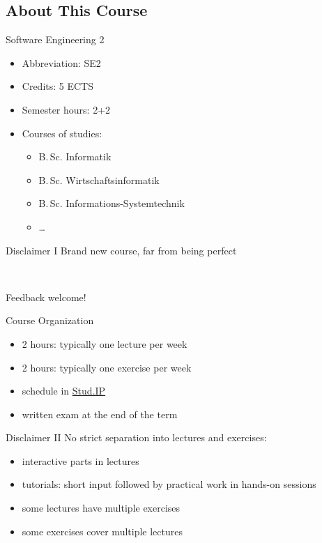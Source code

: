 \newcommand{\StudIPLink}{https://studip.tu-braunschweig.de/dispatch.php/course/details?sem_id=635f5186b364a369979d0f45ab2ace1d}
\newcommand{\StudIP}{\href{\StudIPLink}{Stud.IP}}

\subsection{About This Course} 
\begin{frame}{\insertsubsection}
	\begin{fancycolumns}
		\begin{definition}{Software Engineering 2}
			\begin{itemize}
				\item Abbreviation: SE2
				\item Credits: 5 ECTS
				\item Semester hours: 2+2
				\item Courses of studies:
				\begin{itemize}
					\item B.\,Sc.{} Informatik
					\item B.\,Sc.{} Wirtschaftsinformatik
					\item B.\,Sc.{} Informations-Systemtechnik
					\item \ldots
				\end{itemize}
			\end{itemize}
		\end{definition}
		\begin{note}{Disclaimer I}
			Brand new course, far from being perfect
			
			~
			
			Feedback welcome!
		\end{note}
		\nextcolumn
		\begin{definition}{Course Organization}
			\begin{itemize}
				\item 2 hours: typically one lecture per week
				\item 2 hours: typically one exercise per week
				\item schedule in \StudIP
				\item written exam at the end of the term
			\end{itemize}
		\end{definition}
		\begin{note}{Disclaimer II}
			No strict separation into lectures and exercises:
			\begin{itemize}
				\item interactive parts in lectures
				\item tutorials: short input followed by practical work in hands-on sessions
				\item some lectures have multiple exercises
				\item some exercises cover multiple lectures
			\end{itemize}
		\end{note}
	\end{fancycolumns}
\end{frame}

